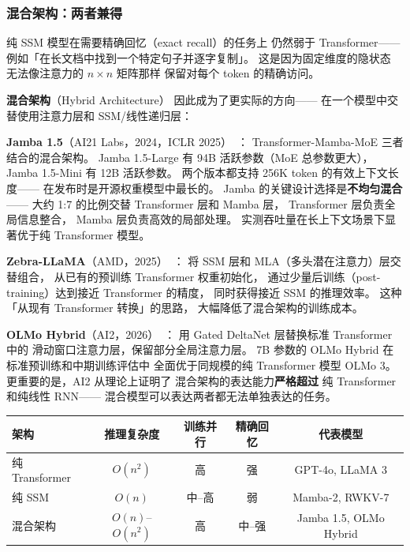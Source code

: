 \subsubsection{混合架构：两者兼得}

纯 SSM 模型在需要精确回忆（exact recall）的任务上
仍然弱于 Transformer——
例如「在长文档中找到一个特定句子并逐字复制」。
这是因为固定维度的隐状态
无法像注意力的 $n \times n$ 矩阵那样
保留对每个 token 的精确访问。

\textbf{混合架构}（Hybrid Architecture）
因此成为了更实际的方向——
在一个模型中交替使用注意力层和 SSM/线性递归层：

\textbf{Jamba 1.5}（AI21 Labs，2024，ICLR 2025）~\cite{jamba2024}：
Transformer-Mamba-MoE 三者结合的混合架构。
Jamba 1.5-Large 有 94B 活跃参数（MoE 总参数更大），
Jamba 1.5-Mini 有 12B 活跃参数。
两个版本都支持 256K token 的有效上下文长度——
在发布时是开源权重模型中最长的。
Jamba 的关键设计选择是\textbf{不均匀混合}——
大约 1:7 的比例交替 Transformer 层和 Mamba 层，
Transformer 层负责全局信息整合，
Mamba 层负责高效的局部处理。
实测吞吐量在长上下文场景下显著优于纯 Transformer 模型。

\textbf{Zebra-LLaMA}（AMD，2025）~\cite{zebra2025}：
将 SSM 层和 MLA（多头潜在注意力）层交替组合，
从已有的预训练 Transformer 权重初始化，
通过少量后训练（post-training）达到接近 Transformer 的精度，
同时获得接近 SSM 的推理效率。
这种「从现有 Transformer 转换」的思路，
大幅降低了混合架构的训练成本。

\textbf{OLMo Hybrid}（AI2，2026）~\cite{olmo2026hybrid}：
用 Gated DeltaNet 层替换标准 Transformer 中的
滑动窗口注意力层，保留部分全局注意力层。
7B 参数的 OLMo Hybrid 在标准预训练和中期训练评估中
全面优于同规模的纯 Transformer 模型 OLMo 3。
更重要的是，AI2 从理论上证明了
混合架构的表达能力\textbf{严格超过}
纯 Transformer 和纯线性 RNN——
混合模型可以表达两者都无法单独表达的任务。

\begin{center}
\begin{tabular}{lcccc}
\hline
\textbf{架构} & \textbf{推理复杂度} & \textbf{训练并行} & \textbf{精确回忆} & \textbf{代表模型} \\
\hline
纯 Transformer & $O(n^2)$ & 高 & 强 & GPT-4o, LLaMA 3 \\
纯 SSM & $O(n)$ & 中--高 & 弱 & Mamba-2, RWKV-7 \\
混合架构 & $O(n)$--$O(n^2)$ & 高 & 中--强 & Jamba 1.5, OLMo Hybrid \\
\hline
\end{tabular}
\end{center}

